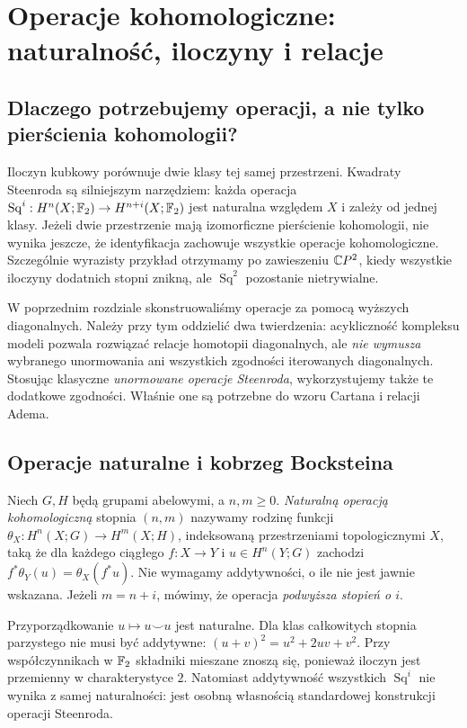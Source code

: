 \chapter{Operacje kohomologiczne: naturalność, iloczyny i relacje}
\label{ch:operacje-v8}

\section{Dlaczego potrzebujemy operacji, a nie tylko pierścienia kohomologii?}
Iloczyn kubkowy porównuje dwie klasy tej samej przestrzeni. Kwadraty
Steenroda są silniejszym narzędziem: każda operacja
$\operatorname{Sq}^i:H^n(X;\mathbb{F}_2)\to H^{n+i}(X;\mathbb{F}_2)$
jest naturalna względem $X$ i zależy od jednej klasy.
Jeżeli dwie przestrzenie mają izomorficzne pierścienie kohomologii,
nie wynika jeszcze, że identyfikacja zachowuje wszystkie operacje
kohomologiczne. Szczególnie wyrazisty przykład otrzymamy po zawieszeniu
$\mathbb{C} P^2$, kiedy wszystkie iloczyny dodatnich stopni znikną, ale
$\operatorname{Sq}^2$ pozostanie nietrywialne.

W poprzednim rozdziale skonstruowaliśmy operacje za pomocą wyższych
diagonalnych. Należy przy tym oddzielić dwa twierdzenia:
acykliczność kompleksu modeli pozwala rozwiązać relacje homotopii
diagonalnych, ale \emph{nie wymusza} wybranego unormowania ani
wszystkich zgodności iterowanych diagonalnych. Stosując klasyczne
\emph{unormowane operacje Steenroda}, wykorzystujemy także te dodatkowe
zgodności. Właśnie one są potrzebne do wzoru Cartana i relacji Adema.

\section{Operacje naturalne i kobrzeg Bocksteina}
\begin{definicja}
Niech $G,H$ będą grupami abelowymi, a $n,m\ge0$.
\emph{Naturalną operacją kohomologiczną} stopnia $(n,m)$ nazywamy
rodzinę funkcji
$\theta_X:H^n(X;G)\to H^m(X;H)$, indeksowaną
przestrzeniami topologicznymi $X$, taką że dla każdego ciągłego
$f:X\to Y$ i $u\in H^n(Y;G)$ zachodzi
$f^*\theta_Y(u)=\theta_X(f^*u)$.
Nie wymagamy addytywności, o ile nie jest jawnie wskazana.
Jeżeli $m=n+i$, mówimy, że operacja \emph{podwyższa stopień o $i$}.
\end{definicja}

\begin{przyklad}
Przyporządkowanie $u\mapsto u\smile u$ jest naturalne. Dla klas
całkowitych stopnia parzystego nie musi być addytywne:
$(u+v)^2=u^2+2uv+v^2$. Przy współczynnikach w $\mathbb{F}_2$ składniki mieszane
znoszą się, ponieważ iloczyn jest przemienny w charakterystyce $2$.
Natomiast addytywność wszystkich $\operatorname{Sq}^i$
nie wynika z samej naturalności: jest osobną własnością
standardowej konstrukcji operacji Steenroda.
\end{przyklad}

